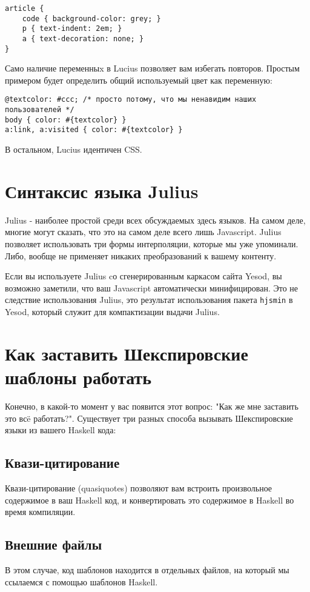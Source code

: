 \begin{lstlisting}
article {
    code { background-color: grey; }
    p { text-indent: 2em; }
    a { text-decoration: none; }
}
\end{lstlisting}

Само наличие переменныx в Lucius позволяет вам избегать повторов. Простым примером
будет определить общий используемый цвет как переменную:

\begin{lstlisting}
@textcolor: #ccc; /* просто потому, что мы ненавидим наших пользователей */
body { color: #{textcolor} }
a:link, a:visited { color: #{textcolor} }
\end{lstlisting}

В остальном, Lucius идентичен CSS.

\section{Синтаксис языка Julius}

Julius - наиболее простой среди всех обсуждаемых здесь языков. На самом деле, 
многие могут сказать, что это на самом деле всего лишь Javascript. Julius
позволяет использовать три формы интерполяции, которые мы уже упоминали.
Либо, вообще не применяет никаких преобразований к вашему контенту.

Если вы используете Julius cо сгенерированным каркасом сайта Yesod, вы возможно заметили, что ваш
Javascript автоматически минифицирован. Это не следствие использования Julius, это
результат использования пакета \lstinline!hjsmin! в Yesod, который служит для компактизации
выдачи Julius.

\section{Как заставить Шекспировские шаблоны работать}

Конечно, в какой-то момент у вас появится этот вопрос: "Как же мне заставить это
всë работать?". Существует три разных способа вызывать Шекспировские языки 
из вашего Haskell кода:

\subsection{Квази-цитирование}
Квази-цитирование (quasiquotes) позволяют вам встроить произвольное содержимое в ваш Haskell код, и
конвертировать это содержимое в Haskell во время компиляции.

\subsection {Внешние файлы}
В этом случае, код шаблонов находится в отдельных файлов, на который мы ссылаемся
с помощью шаблонов Haskell.

